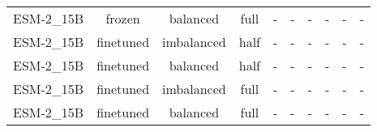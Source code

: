\begin{tabular}{lccccccccc}
   ESM-2\_15B &         frozen &   balanced &      full &           - &           - &           - &           - &           - &           - \\
   ESM-2\_15B &      finetuned & imbalanced &      half &           - &           - &           - &           - &           - &           - \\
   ESM-2\_15B &      finetuned &   balanced &      half &           - &           - &           - &           - &           - &           - \\
   ESM-2\_15B &      finetuned & imbalanced &      full &           - &           - &           - &           - &           - &           - \\
   ESM-2\_15B &      finetuned &   balanced &      full &           - &           - &           - &           - &           - &           - \\
\bottomrule
\end{tabular}
